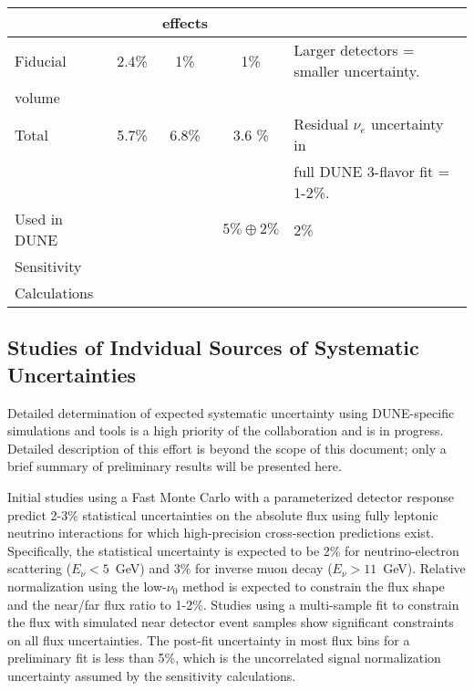 \begin{table}[!hb]
\begin{center}
\begin{tabular}{|l|c|c|c|l|}
 & & effects & & \\ \hline 
Fiducial & 2.4\% & 1\% & 1\% & Larger detectors = smaller uncertainty. \\ 
volume & & & & \\ \hline\hline
Total  & 5.7\% & 6.8\% & 3.6 \% & Residual $\nu_e$ uncertainty in  \\ 
& & & & full DUNE 3-flavor fit = 1-2\%. \\ \hline\hline
Used in DUNE & & & $5\% \oplus 2\%$ & 2\% \\
Sensitivity & & & & \\
Calculations & & & & \\ \hline \hline
\end{tabular}
\end{center}
\end{table}
%
\subsection{Studies of Indvidual Sources of Systematic Uncertainties}
\label{sec:syst_studies_ind}
Detailed determination of expected systematic uncertainty using DUNE-specific
simulations and tools is a high priority of the collaboration and is in progress.
Detailed description of this effort is beyond the scope of this document; only
a brief summary of preliminary results will be presented here. 

Initial studies using a Fast Monte Carlo with a parameterized detector response
predict 2-3\% statistical uncertainties on the absolute flux using fully 
leptonic neutrino interactions for which high-precision cross-section predictions 
exist. Specifically,
the statistical uncertainty is expected to be 2\% for neutrino-electron
scattering ($E_\nu<5$~GeV) and 3\% for inverse muon decay ($E_\nu>11$~GeV).
Relative normalization using the low-$\nu_0$ method is
expected to constrain the flux shape and the near/far flux ratio to 1-2\%.
Studies using a multi-sample fit  to constrain the flux with simulated near detector
event samples show significant constraints on all flux
uncertainties. The post-fit uncertainty 
in most flux bins for a preliminary fit is less
than 5\%, which is the uncorrelated \numu signal normalization
uncertainty assumed by the sensitivity calculations. 


